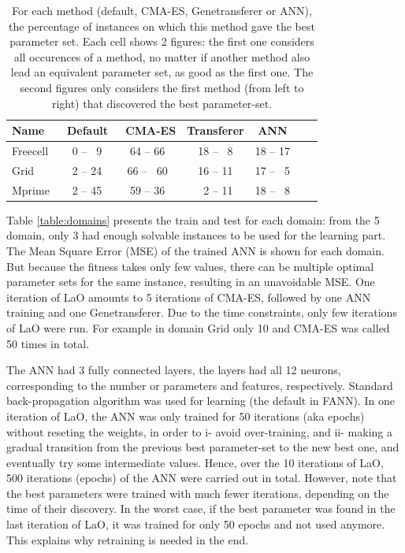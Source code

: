 \documentclass{MYsig-alternate}
\begin{document}
 \begin{table}[tb!]
\centering
\begin{tabular}{l c c c c c c}
\hline\hline
Name & \ Default & \ CMA-ES &  Transferer & ANN \\ 
\hline
Freecell & ~0 -- ~9& 64 -- 66  & 18 -- ~8  & 18 -- 17     \\
Grid & ~2 -- 24 & 66 -- ~60  & 16 -- 11 & 17 -- ~5  &    \\
Mprime &  ~2 -- 45& 59 -- 36 & ~2 -- 11  & 18 -- ~8  &    \\
\hline
\end{tabular}
\caption{For each method (default, CMA-ES, Genetransferer or ANN), the percentage of instances on which this method gave the best parameter set. Each cell shows 2 figures: the first one considers all occurences of a method, no matter if another method also lead an equivalent parameter set, as good as the first one. The second figures only considers the first method (from left to right) that discovered the best parameter-set.}
\label{table:hints}
\end{table} 


Table \ref{table:domains} presents the train and test for each domain: from the 5 domain, only 3 had enough solvable instances to be used for the learning part. The Mean Square Error (MSE) of the trained ANN is shown for each domain. But because the fitness takes only few values, there can be multiple optimal parameter sets for the same instance, resulting in an unavoidable MSE. One iteration of LaO amounts to 5 iterations of CMA-ES, followed by one ANN training and one Genetransferer. Due to the time constraints, only few iterations of LaO were run. For example in domain Grid only 10 and CMA-ES was called 50 times in total.

The ANN had 3 fully connected layers, the layers had all 12 neurons, corresponding to the number or parameters and features, respectively. Standard back-propagation algorithm was used for learning (the default in FANN). In one iteration of LaO, the ANN was only trained for 50 iterations (aka epochs) without reseting the weights, in order to i- avoid over-training, and ii- making a gradual transition from the previous best parameter-set to the new best one, and eventually try some intermediate values. Hence, over the 10 iterations of LaO, 500 iterations (epochs) of the ANN were carried out in total. However, note that the best parameters were trained with much fewer iterations, depending on the time of their discovery. In the worst case, if the best parameter was found in the last iteration of LaO, it was trained for only 50 epochs and not used anymore. This explains why retraining is needed in the end.
\end{document}
